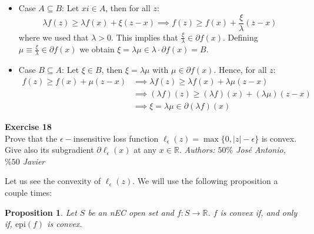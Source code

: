 \documentclass[11pt,table]{article}
\newenvironment{problem}[2][Exercise]
{ \begin{mdframed}[backgroundcolor=gray!20] \textbf{#1 #2} \\}
	{\hspace{0.0cm}\newline\newline \emph{Authors: \(50\%\) José Antonio, \(\%50\) Javier}  \end{mdframed}}
\newtheorem{nprop}{Proposition}
\newcommand\abs[1]{\lvert#1\rvert}
\newcommand\R{\mathbb R}
\begin{document}
\begin{itemize}
	\item Case $A \subseteq B$: Let $xi \in A$, then for all $z$:
	      \[
		      \lambda f(z) \ge \lambda f(x) + \xi (z-x) \implies f(z) \ge f(x) + \frac{\xi}{\lambda}(z-x)
	      \]
	      where we used that $\lambda > 0$. This implies that $\frac{\xi}{\lambda} \in \partial f(x)$. Defining $\mu \equiv \frac{\xi}{\lambda} \in \partial f(x)$ we obtain $\xi = \lambda \mu \in \lambda \cdot \partial f(x) = B$.

	\item Case $B \subseteq A$: Let $\xi \in B$, then $\xi = \lambda \mu$ with $\mu \in \partial f(x)$. Hence, for all $z$:
	      \begin{align*}
		      f(z) \ge f(x) + \mu(z-x) & \implies \lambda f(z) \ge \lambda f(x) + \lambda\mu(z-x)       \\
		                               & \implies (\lambda f)(z) \ge (\lambda f)(x) + (\lambda\mu)(z-x) \\
		                               & \implies \xi = \lambda \mu \in \partial(\lambda f)(x)
	      \end{align*}
\end{itemize}

\begin{problem}{18}
Prove that the \(\epsilon-\)insensitive loss function \(\ell_\epsilon(z) = \max\{0,\abs{z} - \epsilon\}\) is convex. Give also its subgradient \(\partial \ell_\epsilon(x)\) at any \(x \in \R\).
\end{problem}


Let us see the convexity of \(\ell_\epsilon(z)\). We will use the following proposition a couple times:
\begin{nprop}
	Let \(S\) be an nEC open set and \(f:S\to \R\). \(f\) is convex if, and only if, \(\text{epi}(f)\) is convex.
\end{nprop}
\end{document}
